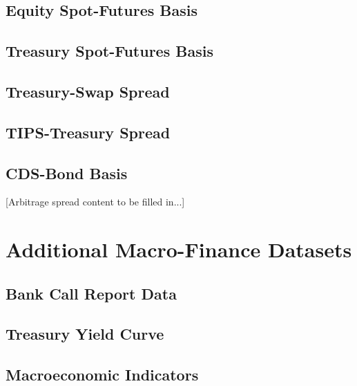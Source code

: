 \documentclass{article}
\begin{document}
\subsection{Equity Spot-Futures Basis}

\subsection{Treasury Spot-Futures Basis}

\subsection{Treasury-Swap Spread}

\subsection{TIPS-Treasury Spread}

\subsection{CDS-Bond Basis}

[Arbitrage spread content to be filled in...]

\section{Additional Macro-Finance Datasets}
\label{sec:additional_datasets}


\subsection{Bank Call Report Data}

\subsection{Treasury Yield Curve}

\subsection{Macroeconomic Indicators}
\end{document}
